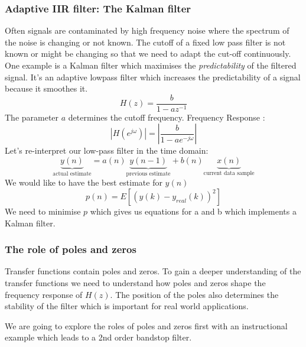 \documentclass[12pt,a4paper]{article}
\begin{document}
\subsubsection{Adaptive IIR filter: The Kalman filter}
Often signals are contaminated by high frequency noise where the
spectrum of the noise is changing or not known. The cutoff of a fixed low
pass filter is not known or might be changing so that we need to adapt the cut-off continuously.
One example is a Kalman filter which maximises the
\textsl{predictability} of the filtered signal. It's an adaptive lowpass filter
which increases the predictability of a signal because it smoothes it.
\begin{equation} 
H(z) = \frac{b}{1 - a z^{-1}}
\end{equation}
The parameter $a$ determines the cutoff frequency.
Frequency Response :
\begin{equation} 
|H(e^{j \omega}) | = |\frac{b}{1 - a e^{-j \omega}}| 
\end{equation}
Let's re-interpret our low-pass filter in the time domain:
\begin{equation} 
\underbrace{y(n)}_{\textrm{actual estimate}} = a(n) \underbrace{y(n - 1)}_{\textrm{previous estimate}} + b(n)\underbrace{x(n)}_{\textrm{current data sample}}
\end{equation}
We would like to have the best estimate for $y(n)$
\begin{equation} 
p(n) = E[ \left( y (k) - y_{real} (k)\right)^{2}] 
\end{equation}
We need to minimise $p$ which gives us equations for a and b which
implements a Kalman filter.




\subsubsection{The role of poles and zeros}
Transfer functions contain poles and zeros. To gain a deeper
understanding of the transfer functions we need to understand
how poles and zeros shape the frequency response of $H(z)$.
The position of the poles also determines the stability of the filter
which is important for real world applications.

We are going to explore the roles of poles and zeros first with
an instructional example which leads to a 2nd order bandstop filter.
\end{document}
